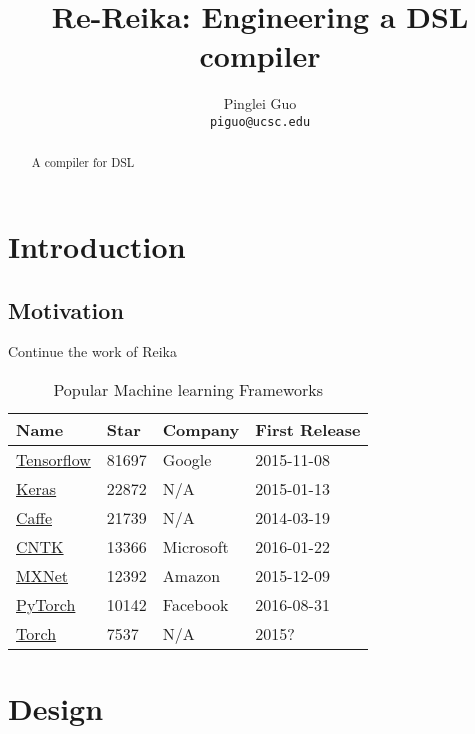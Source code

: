 \documentclass{article}
\title{Re-Reika: Engineering a DSL compiler}
\author{
Pinglei Guo \\
\texttt{piguo@ucsc.edu}
}
\begin{document}
\maketitle

\begin{abstract}
    A compiler for DSL
\end{abstract}

\section{Introduction}
\label{sec:introduction}

\subsection{Motivation}
\label{subsec:motivation}

Continue the work of Reika

\begin{table}[h]
    \caption{Popular Machine learning Frameworks}
    \label{table:ml-frameworks}
    \centering
    \begin{tabular}{llll}
        \toprule
        Name & Star & Company & First Release\\
        \midrule
        \href{https://github.com/tensorflow/tensorflow}{Tensorflow} & 81697 & Google & 2015-11-08 \\
        \href{https://github.com/keras-team/keras}{Keras} & 22872 & N/A & 2015-01-13 \\
        \href{https://github.com/BVLC/caffe}{Caffe} & 21739 & N/A & 2014-03-19 \\
        \href{https://github.com/Microsoft/CNTK}{CNTK} & 13366 & Microsoft & 2016-01-22 \\
        \href{https://github.com/apache/incubator-mxnet}{MXNet} & 12392 & Amazon & 2015-12-09 \\
        \href{https://github.com/pytorch/pytorch}{PyTorch} & 10142 & Facebook & 2016-08-31 \\
        \href{https://github.com/torch/torch7}{Torch} & 7537 & N/A & 2015? \\
        \bottomrule
    \end{tabular}
\end{table}

\section{Design}
\label{sec:design}
\end{document}
